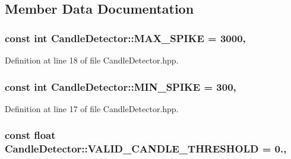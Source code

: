\subsection{Member Data Documentation}
\hypertarget{classCandleDetector_a3903cd4085162f1fc38ca74cac3b954e}{
\subsubsection[{M\-A\-X\-\_\-\-S\-P\-I\-K\-E}]{\setlength{\rightskip}{0pt plus 5cm}const int Candle\-Detector\-::\-M\-A\-X\-\_\-\-S\-P\-I\-K\-E = 3000\hspace{0.3cm}{\ttfamily [static]}, {\ttfamily [private]}}}\label{classCandleDetector_a3903cd4085162f1fc38ca74cac3b954e}


Definition at line 18 of file Candle\-Detector.\-hpp.

\hypertarget{classCandleDetector_a9062a3c45b98c5d051082dbf4a285fd5}{
\subsubsection[{M\-I\-N\-\_\-\-S\-P\-I\-K\-E}]{\setlength{\rightskip}{0pt plus 5cm}const int Candle\-Detector\-::\-M\-I\-N\-\_\-\-S\-P\-I\-K\-E = 300\hspace{0.3cm}{\ttfamily [static]}, {\ttfamily [private]}}}\label{classCandleDetector_a9062a3c45b98c5d051082dbf4a285fd5}


Definition at line 17 of file Candle\-Detector.\-hpp.

\hypertarget{classCandleDetector_ac8aa00d0477ff096c344ec71d8ccdf82}{
\subsubsection[{V\-A\-L\-I\-D\-\_\-\-C\-A\-N\-D\-L\-E\-\_\-\-T\-H\-R\-E\-S\-H\-O\-L\-D}]{\setlength{\rightskip}{0pt plus 5cm}const float Candle\-Detector\-::\-V\-A\-L\-I\-D\-\_\-\-C\-A\-N\-D\-L\-E\-\_\-\-T\-H\-R\-E\-S\-H\-O\-L\-D = 0.\hspace{0.3cm}{\ttfamily [static]}, {\ttfamily [private]}}}\label{classCandleDetector_ac8aa00d0477ff096c344ec71d8ccdf82}


